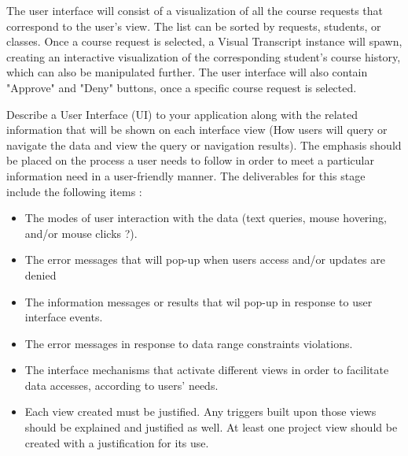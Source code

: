 The user interface will consist of a visualization of all the course requests that correspond to the user's view. The list can be sorted by requests, students, or classes. Once a course request is selected, a Visual Transcript instance will spawn, creating an interactive visualization of the corresponding student's course history, which can also be manipulated further. The user interface will also contain "Approve" and "Deny" buttons, once a specific course request is selected. 

\textnormal{
Describe a User Interface (UI) to your application along with the related information that will be shown on each interface view (How users will query or navigate the data and view the query or navigation results). The emphasis should be placed on the process a user needs to follow in order to meet a particular information need in a user-friendly manner.
The deliverables for this stage include the following items :
}
\begin{itemize} 
\item{The modes of user interaction with the data (text queries, mouse hovering, and/or mouse clicks ?).} 
\item{The error messages that will pop-up when users access and/or updates are denied   }
\item{The information messages or results that wil pop-up in response to user interface events. }
	
\item{ The error messages in response to data range constraints violations.}
	
\item{ The interface mechanisms that activate different views in order to facilitate data accesses, according to users'  needs. }
	
\item{Each view created must be justified. Any triggers built upon those views should be explained and justified as well. At least one project view should be created with a justification for its use. }	
\end{itemize}

